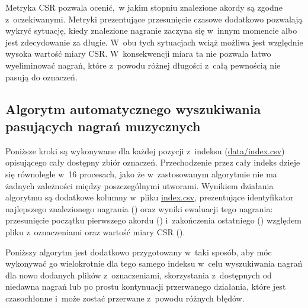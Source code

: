 Metryka CSR pozwala ocenić, w jakim stopniu znalezione akordy są zgodne z~oczekiwanymi. Metryki prezentujące przesunięcie czasowe dodatkowo pozwalają wykryć sytuację, kiedy znalezione nagranie zaczyna się w~innym momencie albo jest zdecydowanie za długie. W~obu tych sytuacjach wciąż możliwa jest względnie wysoka wartość miary CSR. W~konsekwencji miara ta nie pozwala łatwo wyeliminować nagrań, które z~powodu różnej długości z~całą pewnością nie pasują do oznaczeń.

\subsection{Algorytm automatycznego wyszukiwania pasujących nagrań muzycznych}

Poniższe kroki są wykonywane dla każdej pozycji z~indeksu (\url{data/index.csv}) opisującego cały dostępny zbiór oznaczeń. Przechodzenie przez cały indeks dzieje się równolegle w~16 procesach, jako że w~zastosowanym algorytmie nie ma żadnych zależności między poszczególnymi utworami. Wynikiem działania algorytmu są dodatkowe kolumny w~pliku \url{index.csv}, prezentujące identyfikator najlepszego znalezionego nagrania () oraz wyniki ewaluacji tego nagrania: przesunięcie początku pierwszego akordu () i~zakończenia ostatniego () względem pliku z~oznaczeniami oraz wartość miary CSR ().

Poniższy algorytm jest dodatkowo przygotowany w~taki sposób, aby móc wykonywać go wielokrotnie dla tego samego indeksu w~celu wyszukiwania nagrań dla nowo dodanych plików z~oznaczeniami, skorzystania z~dostępnych od niedawna nagrań lub po prostu kontynuacji przerwanego działania, które jest czasochłonne i~może zostać przerwane z~powodu różnych błędów.

